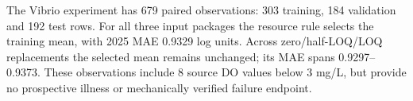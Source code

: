 The Vibrio experiment has 679 paired observations: 303 training, 184 validation and 192 test rows. For all three input packages the resource rule selects the training mean, with 2025 MAE 0.9329 log units. Across zero/half-LOQ/LOQ replacements the selected mean remains unchanged; its MAE spans 0.9297--0.9373. These observations include 8 source DO values below 3 mg/L, but provide no prospective illness or mechanically verified failure endpoint.